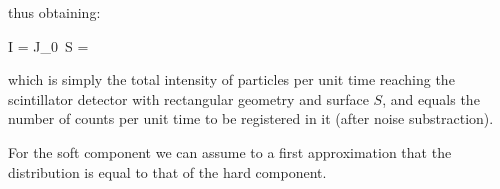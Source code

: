 thus obtaining:

	\be I = J_0 \,S = \ee

which is simply the total intensity of particles per unit time reaching the scintillator detector with rectangular geometry and surface $S$, and equals the number of counts per unit time to be registered in it (after noise substraction).

For the soft component we can assume to a first approximation that the distribution is equal to that of the hard component.

